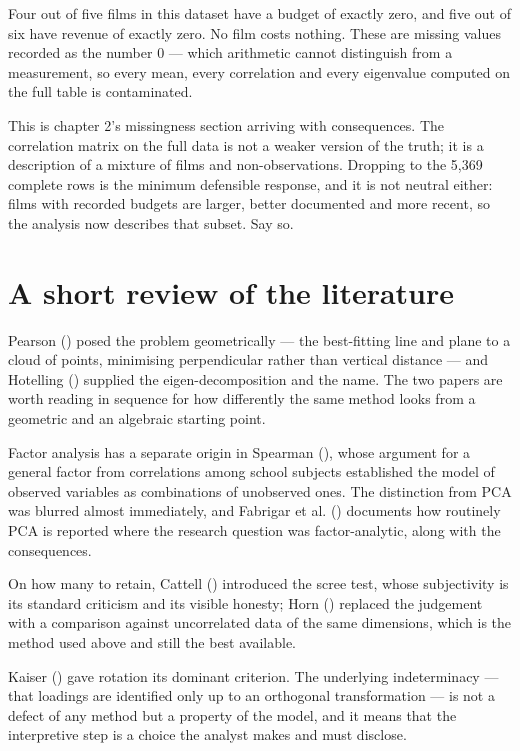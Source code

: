 \documentclass[
  letterpaper,
  10pt,
  twoside,
  openright,
  numbers=noenddot,
  chapterprefix=true]{scrbook}
\begin{document}
Four out of five films in this dataset have a budget of exactly zero,
and five out of six have revenue of exactly zero. No film costs nothing.
These are missing values recorded as the number 0 --- which arithmetic
cannot distinguish from a measurement, so every mean, every correlation
and every eigenvalue computed on the full table is contaminated.

This is chapter 2's missingness section arriving with consequences. The
correlation matrix on the full data is not a weaker version of the
truth; it is a description of a mixture of films and non-observations.
Dropping to the 5,369 complete rows is the minimum defensible response,
and it is not neutral either: films with recorded budgets are larger,
better documented and more recent, so the analysis now describes that
subset. Say so.

\section{A short review of the
literature}\label{a-short-review-of-the-literature-5}

\begin{qmiblit}

Pearson () posed the problem
geometrically --- the best-fitting line and plane to a cloud of points,
minimising perpendicular rather than vertical distance --- and Hotelling
() supplied the eigen-decomposition
and the name. The two papers are worth reading in sequence for how
differently the same method looks from a geometric and an algebraic
starting point.

Factor analysis has a separate origin in Spearman
(), whose argument for a general
factor from correlations among school subjects established the model of
observed variables as combinations of unobserved ones. The distinction
from PCA was blurred almost immediately, and Fabrigar et al.
() documents how routinely PCA is
reported where the research question was factor-analytic, along with the
consequences.

On how many to retain, Cattell ()
introduced the scree test, whose subjectivity is its standard criticism
and its visible honesty; Horn () replaced
the judgement with a comparison against uncorrelated data of the same
dimensions, which is the method used above and still the best available.

Kaiser () gave rotation its dominant
criterion. The underlying indeterminacy --- that loadings are identified
only up to an orthogonal transformation --- is not a defect of any
method but a property of the model, and it means that the interpretive
step is a choice the analyst makes and must disclose.

\end{qmiblit}
\end{document}
